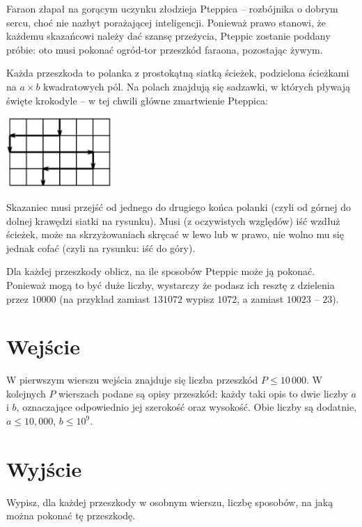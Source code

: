 \documentclass{spiral-kurs}
\begin{document}
\makeheader
%
  Faraon złapał na gorącym uczynku złodzieja Pteppica -- rozbójnika o dobrym sercu, choć nie nazbyt porażającej inteligencji.
  Ponieważ prawo stanowi, że każdemu skazańcowi należy dać szansę przeżycia, Pteppic zostanie poddany próbie: 
  oto musi pokonać ogród-tor przeszkód faraona, pozostając żywym.
  
  Każda przeszkoda to polanka z prostokątną siatką ścieżek, podzielona ścieżkami na $a \times b$ kwadratowych pól.
  Na polach znajdują się sadzawki, w których pływają święte krokodyle -- w tej chwili główne zmartwienie Pteppica:
  
  \begin{center}
   \includegraphics[width=0.3\textwidth]{grid.eps}
  \end{center}
  
  Skazaniec musi przejść od jednego do drugiego końca polanki (czyli od górnej do dolnej krawędzi siatki na rysunku). 
  Musi (z oczywistych względów) iść wzdłuż ścieżek, może na skrzyżowaniach skręcać w lewo lub w prawo, nie wolno mu się jednak cofać (czyli na rysunku: iść do góry).
  
  Dla każdej przeszkody oblicz, na ile sposobów Pteppic może ją pokonać. Ponieważ mogą to być duże liczby, wystarczy że podasz ich resztę z dzielenia przez $10000$
  (na przykład zamiast $131072$ wypisz $1072$, a zamiast $10023$ -- $23$).
  
  \section{Wejście}
  W pierwszym wierszu wejścia znajduje się liczba przeszkód $P \leq 10\,000$. W kolejnych $P$ wierszach podane są opisy przeszkód:
  każdy taki opis to dwie liczby $a$ i $b$, oznaczające odpowiednio jej szerokość oraz wysokość. Obie liczby są dodatnie, $a \leq 10,000$, $b \leq 10^9$.
  
  \section{Wyjście}
  Wypisz, dla każdej przeszkody w osobnym wierszu, liczbę sposobów, na jaką można pokonać tę przeszkodę.
                                  


  
\end{document}
